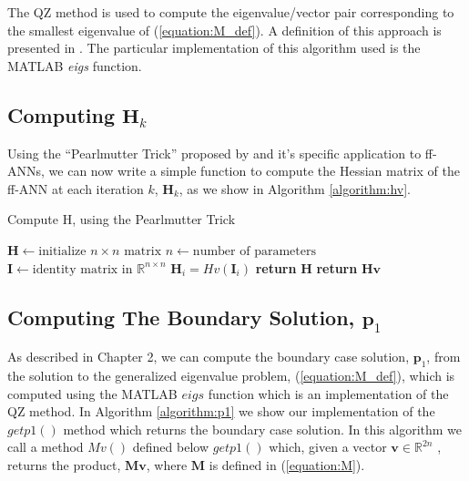 \documentclass[letterpaper,12pt,titlepage,oneside,final]{book}
\begin{document}
	The QZ method is used to compute the eigenvalue/vector pair corresponding to the smallest eigenvalue of (\ref{equation:M_def}). A definition of this approach is presented in \cite{golub1989matrix}. The particular implementation of this algorithm used is the MATLAB \textit{eigs} function. 
	
	\subsection{Computing $\mathbf{H}_{k}$}
	
	Using the ``Pearlmutter Trick'' proposed by \cite{Pearlmutter.1993} and it's specific application to ff-ANNs, we can now write a simple function to compute the Hessian matrix of the ff-ANN at each iteration $k$, $\mathbf{H}_{k}$, as we show in Algorithm \ref{algorithm:hv}.
	
	\makeatletter
	\def\BState{\State\hskip-\ALG@thistlm}
	\makeatother
	
	\begin{algorithm}
		\caption{Compute H, using the Pearlmutter Trick \cite{Pearlmutter.1993}}
		\begin{algorithmic}[1]
			\State $\mathbf{H} \gets \text{initialize } n \times n \text{ matrix}$
			\State $n \gets \text{number of parameters}$
			\State $\mathbf{I} \gets \text{identity matrix in }\mathbb{R}^{n\times n}$
			\State $\mathbf{H}_{i} = Hv(\mathbf{I}_{i})$
			\EndFor
			\State \textbf{return} $\mathbf{H}$
			\EndProcedure
			\State \textbf{return} $\mathbf{Hv}$
			\EndProcedure			
		\end{algorithmic}
		\label{algorithm:hv}
	\end{algorithm}

	\subsection{Computing The Boundary Solution, $\mathbf{p}_{1}$}
	
	As described in Chapter 2, we can compute the boundary case solution, $\mathbf{p}_{1}$, from the solution to the generalized eigenvalue problem, (\ref{equation:M_def}), which is computed using the MATLAB $eigs$ function which is an implementation of the QZ method. In Algorithm \ref{algorithm:p1} we show our implementation of the $getp1()$ method which returns the boundary case solution. In this algorithm we call a method $Mv()$ defined below $getp1()$ which, given a vector $\mathbf{v} \in \mathbb{R}^{2n}$ , returns the product, $\mathbf{Mv}$, where $\mathbf{M}$ is defined in (\ref{equation:M}). 
	
\end{document}
